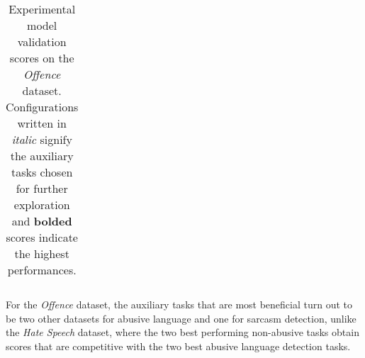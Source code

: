 \begin{table}[h]
\begin{tabular}{l|cccc}
  \end{tabular}
  \caption{Experimental model validation scores on the \textit{Offence} dataset. Configurations written in \textit{italic} signify the auxiliary tasks chosen for further exploration and \textbf{bolded} scores indicate the highest performances.}
  \label{tab:mtl_dev_davidson}
\end{table}

For the \textit{Offence} dataset, the auxiliary tasks that are most beneficial turn out to be two other datasets for abusive language and one for sarcasm detection, unlike the \textit{Hate Speech} dataset, where the two best performing non-abusive tasks obtain scores that are competitive with the two best abusive language detection tasks.

